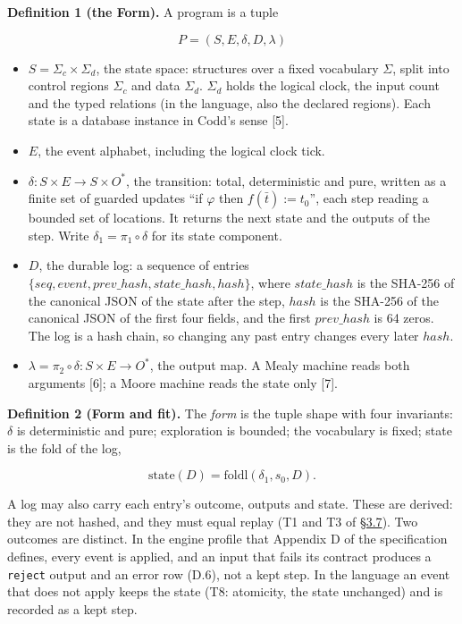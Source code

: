 \documentclass[10pt,letterpaper]{article}
\providecommand{\tightlist}{\setlength{\itemsep}{1pt}\setlength{\parskip}{0pt}}
\begin{document}
\textbf{Definition 1 (the Form).} A program is a tuple

\[P = (S, E, \delta, D, \lambda)\]

\begin{itemize}
\tightlist
\item
  \(S = \Sigma_c \times \Sigma_d\), the state space: structures over a
  fixed vocabulary \(\Sigma\), split into control regions \(\Sigma_c\)
  and data \(\Sigma_d\). \(\Sigma_d\) holds the logical clock, the input
  count and the typed relations (in the language, also the declared
  regions). Each state is a database instance in Codd's sense {[}5{]}.
\item
  \(E\), the event alphabet, including the logical clock tick.
\item
  \(\delta : S \times E \to S \times O^*\), the transition: total,
  deterministic and pure, written as a finite set of guarded updates
  ``if \(\varphi\) then \(f(\bar t) := t_0\)'', each step reading a
  bounded set of locations. It returns the next state and the outputs of
  the step. Write \(\delta_1 = \pi_1 \circ \delta\) for its state
  component.
\item
  \(D\), the durable log: a sequence of entries
  \(\{\mathit{seq}, \mathit{event}, \mathit{prev\_hash}, \mathit{state\_hash}, \mathit{hash}\}\),
  where \(\mathit{state\_hash}\) is the SHA-256 of the canonical JSON of
  the state after the step, \(\mathit{hash}\) is the SHA-256 of the
  canonical JSON of the first four fields, and the first
  \(\mathit{prev\_hash}\) is 64 zeros. The log is a hash chain, so
  changing any past entry changes every later \(\mathit{hash}\).
\item
  \(\lambda = \pi_2 \circ \delta : S \times E \to O^*\), the output map.
  A Mealy machine reads both arguments {[}6{]}; a Moore machine reads
  the state only {[}7{]}.
\end{itemize}

\textbf{Definition 2 (Form and fit).} The \emph{form} is the tuple shape
with four invariants: \(\delta\) is deterministic and pure; exploration
is bounded; the vocabulary is fixed; state is the fold of the log,

\[\mathrm{state}(D) = \mathrm{foldl}(\delta_1, s_0, D).\]

A log may also carry each entry's outcome, outputs and state. These are
derived: they are not hashed, and they must equal replay (T1 and T3 of
\href{https://research.openie.dev/papers/rce/\#37-the-language-one-text-costs-and-theorem-status}{§3.7}).
Two outcomes are distinct. In the engine profile that Appendix D of the
specification defines, every event is applied, and an input that fails
its contract produces a \texttt{reject} output and an error row (D.6),
not a kept step. In the language an event that does not apply keeps the
state (T8: atomicity, the state unchanged) and is recorded as a kept
step.
\end{document}
